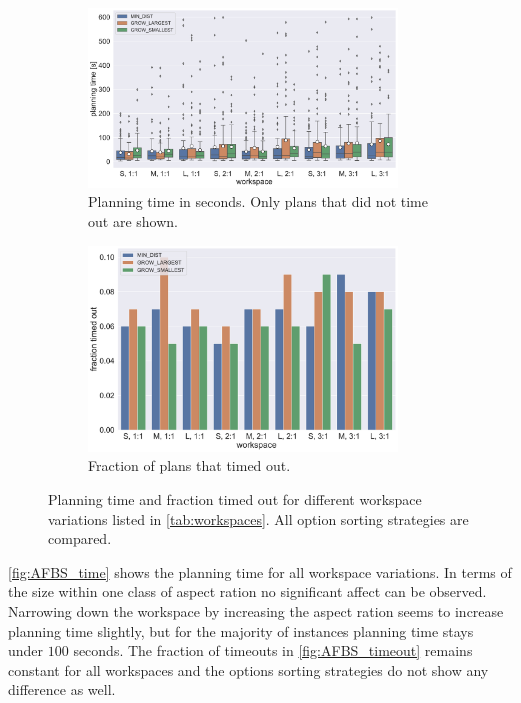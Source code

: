 \begin{figure}
	\centering
	\begin{subfigure}[b]{\textwidth}
		\centering
		\includegraphics[width=0.9\textwidth]{figures/plots/AFBS_time.pdf}
		\caption{Planning time in seconds. Only plans that did not time out are shown.}
		\label{fig:AFBS_time}
	\end{subfigure}
	
	\begin{subfigure}[b]{\textwidth}
		\centering
		\includegraphics[width=0.9\textwidth]{figures/plots/AFBS_timeout.pdf}
		\caption{Fraction of plans that timed out.}
		\label{fig:AFBS_timeout}
	\end{subfigure}
	\caption[Planning time and fraction timed out for different workspace variations]{Planning time and fraction timed out for different workspace variations listed in \autoref{tab:workspaces}. All option sorting strategies are compared.}
	\label{fig:AFBS_timestats}
\end{figure}

\autoref{fig:AFBS_time} shows the planning time for all workspace variations.
In terms of the size within one class of aspect ration no significant affect can be observed.
Narrowing down the workspace by increasing the aspect ration seems to increase planning time slightly, but for the majority of instances planning time stays under $100$ seconds.
The fraction of timeouts in \autoref{fig:AFBS_timeout} remains constant for all workspaces and the options sorting strategies do not show any difference as well.

